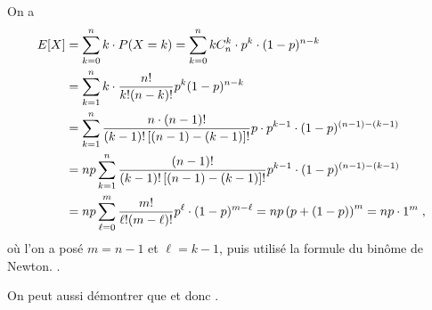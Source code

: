                   On a 
                  \begin{align*}
                        E[X] & = \sum_{k=0}^{n} k \cdot P(X=k)                                                
                               = \sum_{k=0}^{n} k C_{n}^{k} \cdot p^k \cdot (1-p)^{n-k}                        \\
                             & = \sum_{k=1}^{n} k \cdot \frac{n!}{k! (n-k)!} p^k (1-p)^{n-k}                  \\
                             & = \sum_{k=1}^{n} \frac{n \cdot (n-1)!}{(k-1)! \left[ (n-1) - (k-1) \right]!} 
                                       p \cdot p^{k-1} \cdot (1-p)^{(n-1) - (k-1)}                            \\
                             & = n p \sum_{k=1}^{n} \frac{(n-1)!}{(k-1)! \left[ (n-1) - (k-1) \right]!}
                                               p^{k-1} \cdot (1-p)^{(n-1) - (k-1)}                            \\
                             & = n p \sum_{\ell=0}^{m} \frac{m!}{\ell! (m-\ell)!} p^{\ell} \cdot (1-p)^{m-\ell}               
                               = n p \left(p+(1-p)\right)^{m}                                                 
                               = n p \cdot 1^{m}                                                              \;,
                  \end{align*}
                  o\`u l'on a pos\'e $m = n-1$ et $\ell = k-1$, puis utilis\'e la formule du bin\^ome de Newton.
                  .
                  
                  On peut aussi d\'emontrer que 
                   et donc .
                        














